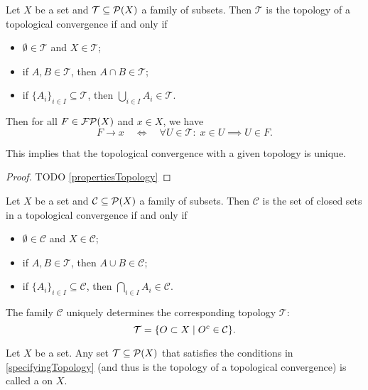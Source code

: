 \begin{proposition} \label{specifyingTopology}
Let $X$ be a set and $\mathcal{T}\subseteq \operatorname{\mathcal{P}}(X)$ a family of subsets. Then $\mathcal{T}$ is the topology of a topological convergence \textup{if and only if}
\begin{itemize}
\item $\emptyset\in \mathcal{T}$ and $X\in \mathcal{T}$;
\item if $A,B\in \mathcal{T}$, then $A\cap B\in \mathcal{T}$;
\item if $\{A_i\}_{i\in I}\subseteq \mathcal{T}$, then $\bigcup_{i\in I}A_i \in \mathcal{T}$.
\end{itemize}
Then for all $F\in\operatorname{\mathcal{FP}}(X)$ and $x\in X$, we have
\[ F\to x \quad\iff\quad \forall U\in \mathcal{T}: \; x\in U \implies U\in F. \]
\end{proposition}
This implies that the topological convergence with a given topology is unique.
\begin{proof}
TODO \ref{propertiesTopology}
\end{proof}
\begin{corollary}
Let $X$ be a set and $\mathcal{C}\subseteq \operatorname{\mathcal{P}}(X)$ a family of subsets. Then $\mathcal{C}$ is the set of closed sets in a topological convergence \textup{if and only if}
\begin{itemize}
\item $\emptyset\in \mathcal{C}$ and $X\in \mathcal{C}$;
\item if $A,B\in \mathcal{T}$, then $A\cup B\in \mathcal{C}$;
\item if $\{A_i\}_{i\in I}\subseteq \mathcal{C}$, then $\bigcap_{i\in I}A_i \in \mathcal{C}$.
\end{itemize}
The family $\mathcal{C}$ uniquely determines the corresponding topology $\mathcal{T}$:
\[ \mathcal{T} = \setbuilder{O\subset X}{O^c\in\mathcal{C}}. \]
\end{corollary}

\begin{definition}
Let $X$ be a set. Any set $\mathcal{T} \subseteq \operatorname{\mathcal{P}}(X)$ that satisfies the conditions in \ref{specifyingTopology} (and thus is the topology of a topological convergence) is called a  on $X$.
\end{definition}


